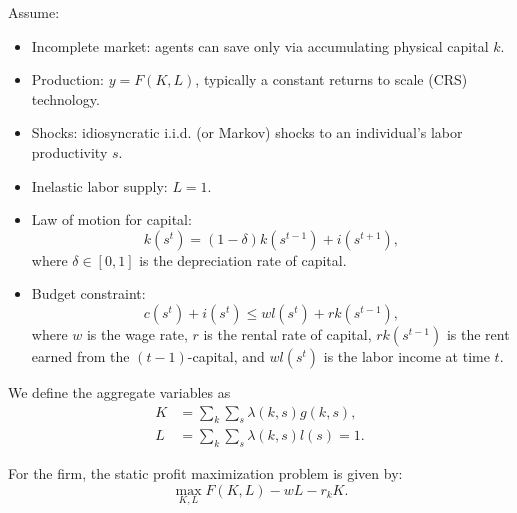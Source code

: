 Assume:
\begin{itemize}
    \item Incomplete market: agents can save only via accumulating physical capital $k$.
    \item Production: $y = F(K,L)$, typically a constant returns to scale (CRS) technology.
    \item Shocks: idiosyncratic i.i.d. (or Markov) shocks to an individual's labor productivity $s$.
    \item Inelastic labor supply: $L = 1$.
    \item Law of motion for capital:
    \[
    k(s^t) = (1-\delta)k(s^{t-1}) + i(s^{t+1}),
    \]
    where $\delta\in [0,1]$ is the depreciation rate of capital.
    \item Budget constraint:
    \[
    c(s^t) + i(s^t) \le wl(s^t) + rk(s^{t-1}),
    \]
    where $w$ is the wage rate, $r$ is the rental rate of capital, $rk(s^{t-1})$ is the rent earned from the $(t-1)$-capital, and $wl(s^t)$ is the labor income at time $t$.
\end{itemize}


We define the aggregate variables as
\[
\begin{aligned}
    K & = \sum_k\sum_s \lambda(k,s)g(k,s),\\
    L & = \sum_k\sum_s\lambda(k,s)l(s) = 1.
\end{aligned}
\]

For the firm, the static profit maximization problem is given by:
\[
\max_{K,L} F(K,L) - wL - r_k K.
\]

